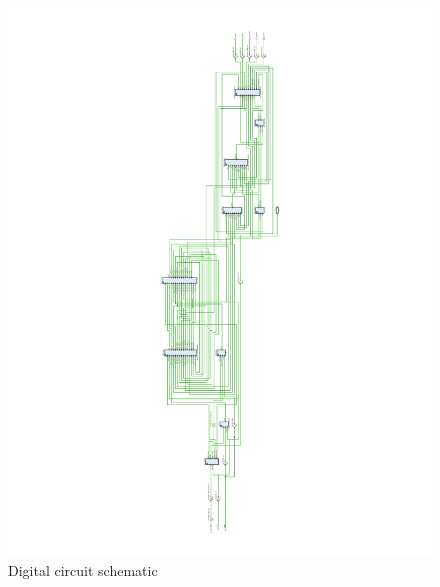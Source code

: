\documentclass[11pt,a4paper]{article}
\begin{document}
    \begin{figure}[!ht]
        \centering
        \includegraphics[width=\textwidth]{src/schematic.pdf}
        \caption{\label{fig:schematic}Digital circuit schematic}
    \end{figure}
\end{document}
